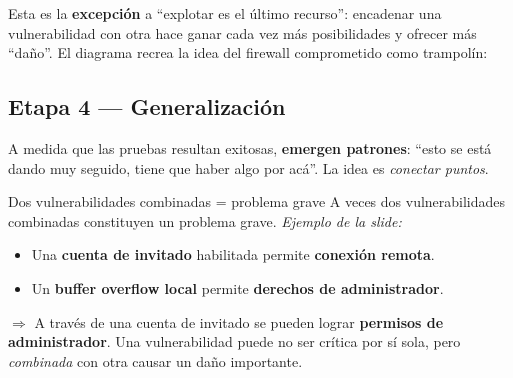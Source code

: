\documentclass[11pt,a4paper]{article}
\begin{document}
Esta es la \textbf{excepción} a ``explotar es el último recurso'': encadenar una
vulnerabilidad con otra hace ganar cada vez más posibilidades y ofrecer más ``daño''. El
diagrama recrea la idea del firewall comprometido como trampolín:

\begin{center}
\end{center}

\subsection{Etapa 4 — Generalización}

A medida que las pruebas resultan exitosas, \textbf{emergen patrones}: ``esto se está dando
muy seguido, tiene que haber algo por acá''. La idea es \emph{conectar puntos}.

\begin{warnbox}{Dos vulnerabilidades combinadas = problema grave}
A veces dos vulnerabilidades combinadas constituyen un problema grave. \emph{Ejemplo de la
slide:}
\begin{itemize}[leftmargin=1.4em,itemsep=1pt]
  \item Una \textbf{cuenta de invitado} habilitada permite \textbf{conexión remota}.
  \item Un \textbf{buffer overflow local} permite \textbf{derechos de administrador}.
\end{itemize}
$\Rightarrow$ A través de una cuenta de invitado se pueden lograr \textbf{permisos de
administrador}. Una vulnerabilidad puede no ser crítica por sí sola, pero \emph{combinada} con
otra causar un daño importante.
\end{warnbox}
\end{document}
